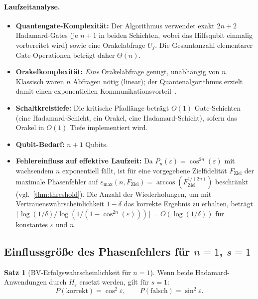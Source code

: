 ﻿\documentclass[11pt,a4paper]{article}
\theoremstyle{definition}
\newtheorem{theorem}{Satz}[section]
\newcommand{\eps}{\varepsilon}
\newcommand{\Heps}{H_{\!\varepsilon}}
\begin{document}
\paragraph{Laufzeitanalyse.}
\begin{itemize}[leftmargin=*]
  \item \textbf{Quantengate-Komplexität:} Der Algorithmus verwendet exakt
    $2n+2$ Hadamard-Gates (je $n+1$ in beiden Schichten, wobei das
    Hilfsqubit einmalig vorbereitet wird) sowie eine Orakelabfrage $U_f$.
    Die Gesamtanzahl elementarer Gate-Operationen beträgt daher
    $\Theta(n)$.
  \item \textbf{Orakelkomplexität:} \emph{Eine} Orakelabfrage genügt,
    unabhängig von $n$.  Klassisch wären $n$ Abfragen nötig (linear);
    der Quantenalgorithmus erzielt damit einen exponentiellen
    Kommunikationsvorteil~\cite{BV1993}.
  \item \textbf{Schaltkreistiefe:} Die kritische Pfadlänge beträgt $O(1)$
    Gate-Schichten (eine Hadamard-Schicht, ein Orakel, eine Hadamard-Schicht),
    sofern das Orakel in $O(1)$ Tiefe implementiert wird.
  \item \textbf{Qubit-Bedarf:} $n+1$ Qubits.
  \item \textbf{Fehlereinfluss auf effektive Laufzeit:}  Da
    $P_n(\eps)=\cos^{2n}(\eps)$ mit wachsendem $n$ exponentiell fällt,
    ist für eine vorgegebene Zielfidelität $F_{\mathrm{Ziel}}$ der
    maximale Phasenfehler auf
    $\eps_{\max}(n,F_{\mathrm{Ziel}}) = \arccos(F_{\mathrm{Ziel}}^{1/(2n)})$
    beschränkt (vgl.\ \cref{thm:threshold}).  Die Anzahl der
    Wiederholungen, um mit Vertrauenswahrscheinlichkeit $1-\delta$
    das korrekte Ergebnis zu erhalten, beträgt
    $\lceil\log(1/\delta)/\log(1/(1-\cos^{2n}(\eps)))\rceil = O(\log(1/\delta))$
    für konstantes $\eps$ und $n$.
\end{itemize}

\subsection{Einflussgröße des Phasenfehlers für $n=1$, $s=1$}
\label{subsec:bv_n1}

\begin{theorem}[BV-Erfolgswahrscheinlichkeit für $n=1$]
\label{thm:bv_n1}
  Wenn beide Hadamard-Anwendungen durch $\Heps$ ersetzt werden, gilt für $s=1$:
  \begin{equation}
    P(\text{korrekt}) = \cos^2\!\eps, \qquad P(\text{falsch}) = \sin^2\!\eps.
    \label{eq:bv_n1}
  \end{equation}
\end{theorem}
\end{document}
